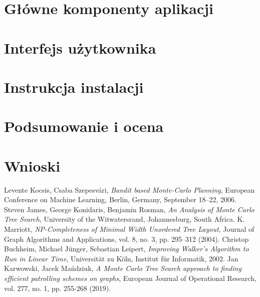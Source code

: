 \documentclass[a4paper,11pt,twoside]{report}
\theoremstyle{definition}
\begin{document}
\chapter{Główne komponenty aplikacji}


\chapter{Interfejs użytkownika} \label{chap:ui}


\chapter{Instrukcja instalacji} \label{chap:guides}


\chapter{Podsumowanie i ocena}


\chapter{Wnioski}



\begin{thebibliography}{20}%
 Levente Kocsis, Csaba Szepesvári, \emph{Bandit based Monte-Carlo Planning}, European Conference on Machine Learning, Berlin, Germany, September 18--22, 2006.
 Steven James, George Konidaris, Benjamin Rosman, \emph{An Analysis of Monte Carlo Tree Search}, University of the Witwatersrand, Johannesburg, South Africa.
 K. Marriott, \emph{NP-Completeness of Minimal Width Unordered Tree Layout}, Journal of Graph Algorithms and Applications, vol. 8, no. 3, pp. 295--312 (2004).
 Christop Buchheim, Michael Jünger, Sebastian Leipert, \emph{Improving Walker's Algorithm to Run in Linear Time}, Universität zu Köln, Institut für Informatik, 2002.
 Jan Karwowski, Jacek Mańdziuk, \emph{A Monte Carlo Tree Search approach to finding efficient patrolling schemes on graphs}, European Journal of Operational Research, vol. 277, no. 1, pp. 255-268 (2019).
\end{thebibliography}
\end{document}
